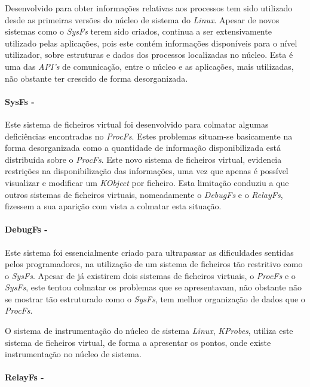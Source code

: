 Desenvolvido para obter informações relativas aos processos tem sido utilizado desde as primeiras versões do núcleo de sistema do \textit{Linux}.
Apesar de novos sistemas como o \textit{SysFs} terem sido criados, continua a ser extensivamente utilizado pelas aplicações, pois este contém informações disponíveis para o nível utilizador, sobre estruturas e dados dos processos localizadas no núcleo.
Esta é uma das \textit{API's} de comunicação, entre o núcleo e as aplicações, mais utilizadas, não obstante ter crescido de forma desorganizada.

\paragraph*{SysFs - }\label{cap:SysFs_overview}

Este sistema de ficheiros virtual foi desenvolvido para colmatar algumas deficiências encontradas no \textit{ProcFs}.
Estes problemas situam-se basicamente na forma desorganizada como a quantidade de informação disponibilizada está distribuída sobre o \textit{ProcFs}.
Este novo sistema de ficheiros virtual, evidencia restrições na disponibilização das informações, uma vez que apenas é possível visualizar e modificar um \textit{KObject} por ficheiro.
Esta limitação conduziu a que outros sistemas de ficheiros virtuais, nomeadamente o \textit{DebugFs} e o \textit{RelayFs}, fizessem a sua aparição com vista a colmatar esta situação.

\paragraph*{DebugFs - }\label{cap:DebugFs_overview}

Este sistema foi essencialmente criado para ultrapassar as dificuldades sentidas pelos programadores, na utilização de um sistema de ficheiros tão restritivo como o \textit{SysFs}.
Apesar de já existirem dois sistemas de ficheiros virtuais, o \textit{ProcFs} e o \textit{SysFs}, este tentou colmatar os problemas que se apresentavam, não obstante não se mostrar tão estruturado como o \textit{SysFs}, tem melhor organização de dados que o \textit{ProcFs}.

O sistema de instrumentação do núcleo de sistema \textit{Linux}, \textit{KProbes}, utiliza este sistema de ficheiros virtual, de forma a apresentar os pontos, onde existe instrumentação no núcleo de sistema.

\paragraph*{RelayFs - }\label{cap:RelayFs_overview}


